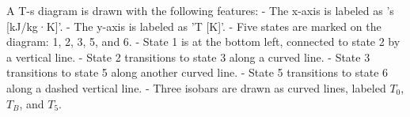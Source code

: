 A T-s diagram is drawn with the following features:  
- The x-axis is labeled as 's [kJ/kg·K]'.  
- The y-axis is labeled as 'T [K]'.  
- Five states are marked on the diagram: 1, 2, 3, 5, and 6.  
- State 1 is at the bottom left, connected to state 2 by a vertical line.  
- State 2 transitions to state 3 along a curved line.  
- State 3 transitions to state 5 along another curved line.  
- State 5 transitions to state 6 along a dashed vertical line.  
- Three isobars are drawn as curved lines, labeled \( T_0 \), \( T_B \), and \( T_5 \).